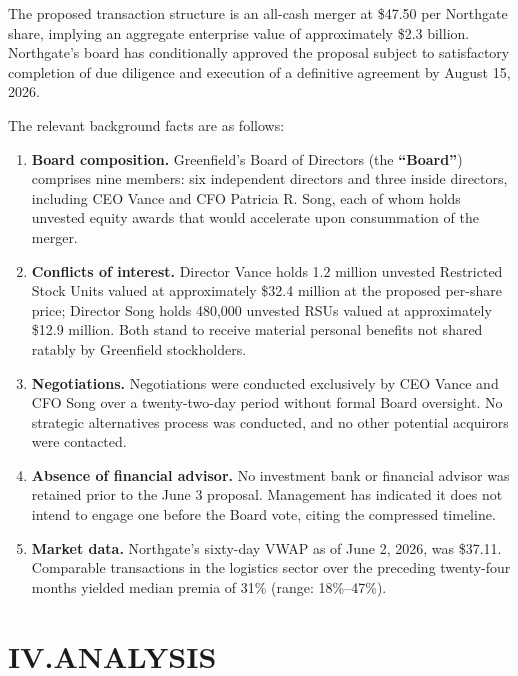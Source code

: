 \documentclass[11pt,letterpaper]{article}
\newcommand{\term}[1]{\textbf{``#1''}}
\begin{document}
The proposed transaction structure is an all-cash merger at \$47.50 per Northgate share, implying an aggregate enterprise value of approximately \$2.3 billion.  Northgate's board has conditionally approved the proposal subject to satisfactory completion of due diligence and execution of a definitive agreement by August 15, 2026.

The relevant background facts are as follows:

\begin{enumerate}
  \item \textbf{Board composition.}  Greenfield's Board of Directors (the \term{Board}) comprises nine members: six independent directors and three inside directors, including CEO Vance and CFO Patricia R. Song, each of whom holds unvested equity awards that would accelerate upon consummation of the merger.
  \item \textbf{Conflicts of interest.}  Director Vance holds 1.2 million unvested Restricted Stock Units valued at approximately \$32.4 million at the proposed per-share price; Director Song holds 480,000 unvested RSUs valued at approximately \$12.9 million.  Both stand to receive material personal benefits not shared ratably by Greenfield stockholders.
  \item \textbf{Negotiations.}  Negotiations were conducted exclusively by CEO Vance and CFO Song over a twenty-two-day period without formal Board oversight.  No strategic alternatives process was conducted, and no other potential acquirors were contacted.
  \item \textbf{Absence of financial advisor.}  No investment bank or financial advisor was retained prior to the June 3 proposal.  Management has indicated it does not intend to engage one before the Board vote, citing the compressed timeline.
  \item \textbf{Market data.}  Northgate's sixty-day VWAP as of June 2, 2026, was \$37.11.  Comparable transactions in the logistics sector over the preceding twenty-four months yielded median premia of 31\% (range: 18\%--47\%).
\end{enumerate}

\vspace{6pt}

\section*{IV.\quad ANALYSIS}
\end{document}
